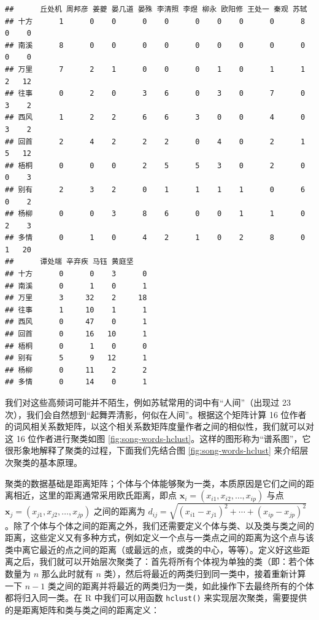 \documentclass[
  b5paper,
  UTF8,twoside]{book}
\begin{document}
\begin{verbatim}
##      丘处机 周邦彦 姜夔 晏几道 晏殊 李清照 李煜 柳永 欧阳修 王处一 秦观 苏轼
## 十方      1      0    0      0    0      0    0    0      0      8    0    0
## 南溪      8      0    0      0    0      0    0    0      0      0    0    0
## 万里      7      2    1      0    0      0    1    0      1      1    2   12
## 往事      0      2    0      3    6      0    3    0      7      0    3    2
## 西风      1      2    2      6    6      3    0    0      4      0    3    2
## 回首      2      4    2      2    2      0    4    0      2      1    5   12
## 梧桐      0      0    0      2    5      5    3    0      2      0    0    3
## 别有      2      3    2      0    1      1    1    1      0      6    0    2
## 杨柳      0      0    3      8    6      0    0    1      1      0    2    3
## 多情      0      1    0      4    2      1    0    2      8      0    1   20
##      谭处端 辛弃疾 马钰 黄庭坚
## 十方      0      0    3      0
## 南溪      0      1    0      1
## 万里      3     32    2     18
## 往事      1     10    1      1
## 西风      0     47    0      1
## 回首      0     16   10      1
## 梧桐      0      1    0      0
## 别有      5      9   12      1
## 杨柳      0     11    2      2
## 多情      0     14    0      1
\end{verbatim}

我们对这些高频词可能并不陌生，例如苏轼常用的词中有``人间''（出现过 23 次），我们会自然想到``起舞弄清影，何似在人间''。根据这个矩阵计算 16 位作者的词风相关系数矩阵，以这个相关系数矩阵度量作者之间的相似性，我们就可以对这 16 位作者进行聚类如图 \ref{fig:song-words-hclust}。这样的图形称为``谱系图''，它很形象地解释了聚类的过程，下面我们先结合图 \ref{fig:song-words-hclust} 来介绍层次聚类的基本原理。

聚类的数据基础是距离矩阵；个体与个体能够聚为一类，本质原因是它们之间的距离相近，这里的距离通常采用欧氏距离，即点 \(\mathbf{x}_{i}=(x_{i1},x_{i2},\ldots,x_{ip})\) 与点 \(\mathbf{x}_{j}=(x_{j1},x_{j2},\ldots,x_{jp})\) 之间的距离为 \(d_{ij}=\sqrt{(x_{i1}-x_{j1})^{2}+\cdots+(x_{ip}-x_{jp})^{2}}\)。除了个体与个体之间的距离之外，我们还需要定义个体与类、以及类与类之间的距离，这些定义又有多种方式，例如定义一个点与一类点之间的距离为这个点与该类中离它最近的点之间的距离（或最远的点，或类的中心，等等）。定义好这些距离之后，我们就可以开始层次聚类了：首先将所有个体视为单独的类（即：若个体数量为 \(n\) 那么此时就有 \(n\) 类），然后将最近的两类归到同一类中，接着重新计算一下 \(n-1\) 类之间的距离并将最近的两类归为一类，如此操作下去最终所有的个体都将归入同一类。在 R 中我们可以用函数 \texttt{hclust()} 来实现层次聚类，需要提供的是距离矩阵和类与类之间的距离定义：
\end{document}
